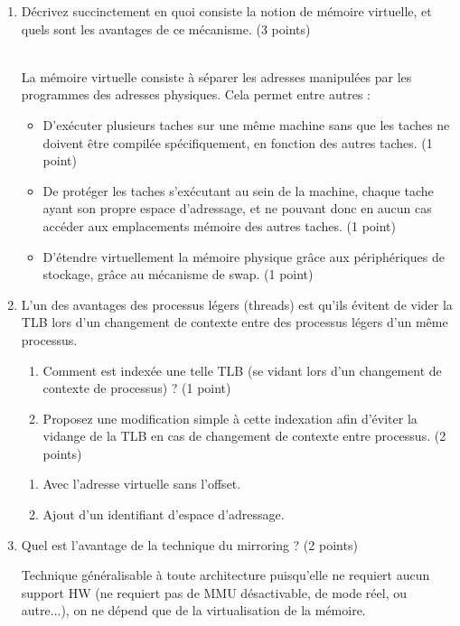 \begin{enumerate}

\item Décrivez succinctement en quoi consiste la notion de mémoire virtuelle, et quels sont les avantages de ce mécanisme. (3 points)

\begin{correction}\\
La mémoire virtuelle consiste à séparer les adresses manipulées par les programmes des adresses physiques. Cela permet entre autres :
\begin{itemize}
  \item D'exécuter plusieurs taches  sur une même machine sans que les taches ne doivent être compilée spécifiquement, en fonction des autres taches. (1 point)
  \item De protéger les taches s'exécutant au sein de la machine, chaque tache ayant son propre espace d'adressage, et ne pouvant donc en aucun cas accéder aux emplacements mémoire des autres taches. (1 point)
  \item D'étendre virtuellement la mémoire physique grâce aux périphériques de stockage, grâce au mécanisme de swap. (1 point)
\end{itemize}
\end{correction}


\item L'un des avantages des processus légers (threads) est qu'ils évitent de vider la TLB lors d'un changement de contexte entre des processus légers d'un même processus.
\begin{enumerate}
  \item Comment est indexée une telle TLB (se vidant lors d'un changement de contexte de processus) ? (1 point)
  \item Proposez une modification simple à cette indexation afin d'éviter la vidange de la TLB en cas de changement de contexte entre processus. (2 points)
\end{enumerate}

\begin{correction}
\begin{enumerate}[label=(\alph*)]
\item Avec l'adresse virtuelle sans l'offset.
\item Ajout d'un identifiant d'espace d'adressage.
\end{enumerate}
\end{correction}

\item Quel est l'avantage de la technique du mirroring ? (2 points)

\begin{correction}
Technique généralisable à toute architecture puisqu'elle ne requiert aucun support HW (ne requiert pas de MMU désactivable, de mode réel, ou autre...), on ne dépend que de la virtualisation de la mémoire.
\end{correction}


\end{enumerate}


